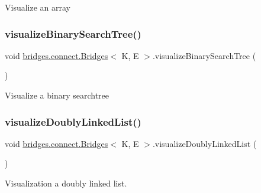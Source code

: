 Visualize an array \hypertarget{classbridges_1_1connect_1_1_bridges_a283d29561d78a890f01c8735c18d17d0}{}\label{classbridges_1_1connect_1_1_bridges_a283d29561d78a890f01c8735c18d17d0} 
\subsubsection{\texorpdfstring{visualize\+Binary\+Search\+Tree()}{visualizeBinarySearchTree()}}
{\footnotesize\ttfamily void \hyperlink{classbridges_1_1connect_1_1_bridges}{bridges.\+connect.\+Bridges}$<$ K, E $>$.visualize\+Binary\+Search\+Tree (\begin{DoxyParamCaption}{ }\end{DoxyParamCaption})\hspace{0.3cm}{\ttfamily [protected]}}

Visualize a binary searchtree \hypertarget{classbridges_1_1connect_1_1_bridges_ac1ac1db8cf7123aefb83ab05af83375d}{}\label{classbridges_1_1connect_1_1_bridges_ac1ac1db8cf7123aefb83ab05af83375d} 
\subsubsection{\texorpdfstring{visualize\+Doubly\+Linked\+List()}{visualizeDoublyLinkedList()}}
{\footnotesize\ttfamily void \hyperlink{classbridges_1_1connect_1_1_bridges}{bridges.\+connect.\+Bridges}$<$ K, E $>$.visualize\+Doubly\+Linked\+List (\begin{DoxyParamCaption}{ }\end{DoxyParamCaption})\hspace{0.3cm}{\ttfamily [protected]}}

Visualization a doubly linked list. \hypertarget{classbridges_1_1connect_1_1_bridges_a7470f7a358eee6a6cded3ab42f8b9cdc}{}\label{classbridges_1_1connect_1_1_bridges_a7470f7a358eee6a6cded3ab42f8b9cdc} 

